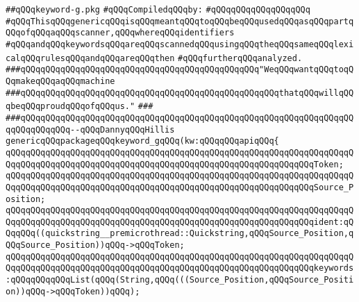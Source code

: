 \label{src/lib/src/keyword-g.pkg}
\verb|##qQQqkeyword-g.pkg|\newline
\newline
\verb|#qQQqCompiledqQQqby:|\newline
\verb|#qQQqqQQqqQQqqQQqqQQq|\newline
\newline
\verb|#qQQqThisqQQqgenericqQQqisqQQqmeantqQQqtoqQQqbeqQQqusedqQQqasqQQqpartqQQqofqQQqaqQQqscanner,qQQqwhereqQQqidentifiers|\newline
\verb|#qQQqandqQQqkeywordsqQQqareqQQqscannedqQQqusingqQQqtheqQQqsameqQQqlexicalqQQqrulesqQQqandqQQqareqQQqthen|\newline
\verb|#qQQqfurtherqQQqanalyzed.|\newline
\newline
\newline
\verb|###qQQqqQQqqQQqqQQqqQQqqQQqqQQqqQQqqQQqqQQqqQQqqQQq"WeqQQqwantqQQqtoqQQqmakeqQQqaqQQqmachine|\newline
\verb|###qQQqqQQqqQQqqQQqqQQqqQQqqQQqqQQqqQQqqQQqqQQqqQQqqQQqthatqQQqwillqQQqbeqQQqproudqQQqofqQQqus."|\newline
\verb|###|\newline
\verb|###qQQqqQQqqQQqqQQqqQQqqQQqqQQqqQQqqQQqqQQqqQQqqQQqqQQqqQQqqQQqqQQqqQQqqQQqqQQqqQQq--qQQqDannyqQQqHillis|\newline
\newline
\newline
\verb|genericqQQqpackageqQQqkeyword_gqQQq(kw:qQQqqQQqapiqQQq{|\newline
\verb|qQQqqQQqqQQqqQQqqQQqqQQqqQQqqQQqqQQqqQQqqQQqqQQqqQQqqQQqqQQqqQQqqQQqqQQqqQQqqQQqqQQqqQQqqQQqqQQqqQQqqQQqqQQqqQQqqQQqqQQqqQQqqQQqqQQqToken;|\newline
\verb|qQQqqQQqqQQqqQQqqQQqqQQqqQQqqQQqqQQqqQQqqQQqqQQqqQQqqQQqqQQqqQQqqQQqqQQqqQQqqQQqqQQqqQQqqQQqqQQqqQQqqQQqqQQqqQQqqQQqqQQqqQQqqQQqqQQqSource_Position;|\newline
\verb|qQQqqQQqqQQqqQQqqQQqqQQqqQQqqQQqqQQqqQQqqQQqqQQqqQQqqQQqqQQqqQQqqQQqqQQqqQQqqQQqqQQqqQQqqQQqqQQqqQQqqQQqqQQqqQQqqQQqqQQqqQQqqQQqqQQqident:qQQqqQQq((quickstring__premicrothread::Quickstring,qQQqSource_Position,qQQqSource_Position))qQQq->qQQqToken;|\newline
\verb|qQQqqQQqqQQqqQQqqQQqqQQqqQQqqQQqqQQqqQQqqQQqqQQqqQQqqQQqqQQqqQQqqQQqqQQqqQQqqQQqqQQqqQQqqQQqqQQqqQQqqQQqqQQqqQQqqQQqqQQqqQQqqQQqqQQqkeywords:qQQqqQQqqQQqList(qQQq(String,qQQq(((Source_Position,qQQqSource_Position))qQQq->qQQqToken))qQQq);|\newline
